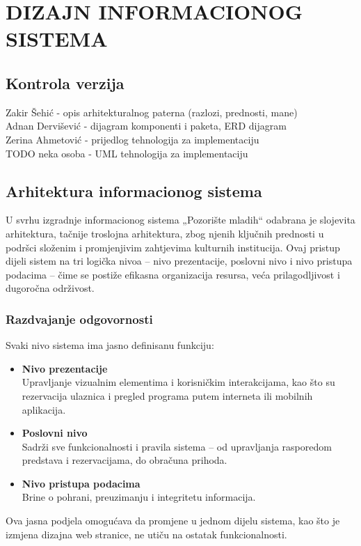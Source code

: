 \sloppy
\chapter{DIZAJN INFORMACIONOG SISTEMA}

\sloppy
\section*{Kontrola verzija}

Zakir Šehić - opis arhitekturalnog paterna (razlozi, prednosti, mane)\\
Adnan Dervišević - dijagram komponenti i paketa, ERD dijagram\\
Zerina Ahmetović - prijedlog tehnologija za implementaciju\\
TODO neka osoba - UML tehnologija za implementaciju

\section{Arhitektura informacionog sistema}

U svrhu izgradnje informacionog sistema „Pozorište mladih“ odabrana je slojevita arhitektura, tačnije troslojna arhitektura, zbog njenih ključnih prednosti u podršci složenim i promjenjivim zahtjevima kulturnih institucija. Ovaj pristup dijeli sistem  na tri logička nivoa – nivo prezentacije, poslovni nivo i nivo pristupa podacima – čime se postiže efikasna organizacija resursa, veća prilagodljivost i dugoročna održivost.

\subsection{Razdvajanje odgovornosti}

Svaki nivo sistema ima jasno definisanu funkciju:
\begin{itemize}[label=\textbullet]
    \item \textbf{Nivo prezentacije} \\
    Upravljanje vizualnim elementima i korisničkim interakcijama, kao što su rezervacija ulaznica i pregled programa putem interneta ili mobilnih aplikacija.
    \item \textbf{Poslovni nivo} \\
    Sadrži sve funkcionalnosti i pravila sistema – od upravljanja rasporedom predstava i rezervacijama, do obračuna prihoda.
    \item \textbf{Nivo pristupa podacima} \\
    Brine o pohrani, preuzimanju i integritetu informacija.
\end{itemize}
Ova jasna podjela omogućava da promjene u jednom dijelu sistema, kao što je izmjena dizajna web stranice, ne utiču na ostatak funkcionalnosti.

